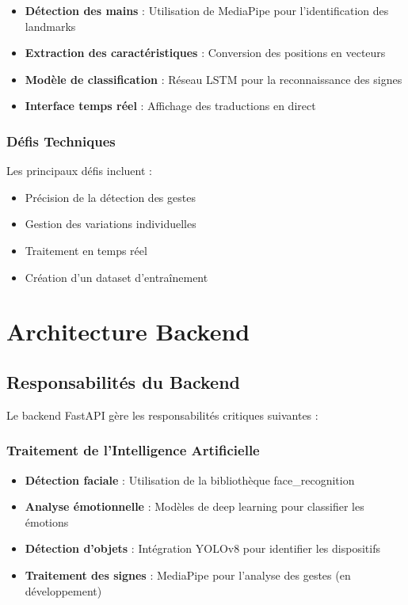 \documentclass[12pt,a4paper]{article}
\begin{document}
\begin{itemize}
    \item \textbf{Détection des mains} : Utilisation de MediaPipe pour l'identification des landmarks
    \item \textbf{Extraction des caractéristiques} : Conversion des positions en vecteurs
    \item \textbf{Modèle de classification} : Réseau LSTM pour la reconnaissance des signes
    \item \textbf{Interface temps réel} : Affichage des traductions en direct
\end{itemize}

\subsubsection{Défis Techniques}
Les principaux défis incluent :
\begin{itemize}
    \item Précision de la détection des gestes
    \item Gestion des variations individuelles
    \item Traitement en temps réel
    \item Création d'un dataset d'entraînement
\end{itemize}

\section{Architecture Backend}

\subsection{Responsabilités du Backend}

Le backend FastAPI gère les responsabilités critiques suivantes :

\subsubsection{Traitement de l'Intelligence Artificielle}
\begin{itemize}
    \item \textbf{Détection faciale} : Utilisation de la bibliothèque face\_recognition
    \item \textbf{Analyse émotionnelle} : Modèles de deep learning pour classifier les émotions
    \item \textbf{Détection d'objets} : Intégration YOLOv8 pour identifier les dispositifs
    \item \textbf{Traitement des signes} : MediaPipe pour l'analyse des gestes (en développement)
\end{itemize}
\end{document}
